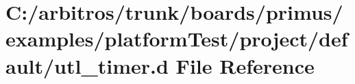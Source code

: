 \hypertarget{boards_2primus_2examples_2platform_test_2project_2default_2utl__timer_8d}{\section{C\-:/arbitros/trunk/boards/primus/examples/platform\-Test/project/default/utl\-\_\-timer.d File Reference}
\label{boards_2primus_2examples_2platform_test_2project_2default_2utl__timer_8d}
}
